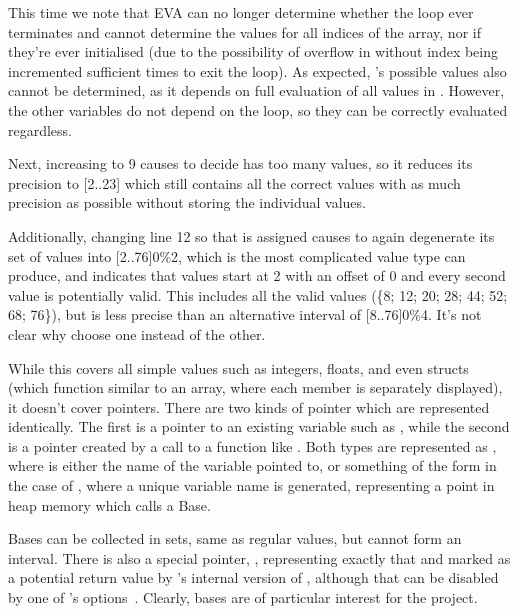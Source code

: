 This time we note that EVA can no longer determine whether the loop ever terminates and cannot determine the values for all indices of the  array, nor if they're ever initialised (due to the possibility of overflow in  without index being incremented sufficient times to exit the loop). As expected, 's possible values also cannot be determined, as it depends on full evaluation of all values in . However, the other variables do not depend on the loop, so they can be correctly evaluated regardless.

Next, increasing  to 9 causes  to decide  has too many values, so it reduces its precision to [2..23] which still contains all the correct values with as much precision as possible without storing the individual values.

Additionally, changing line 12 so that  is assigned  causes  to again degenerate its set of values into [2..76]0\%2, which is the most complicated value type  can produce, and indicates that values start at 2 with an offset of 0 and every second value is potentially valid. This includes all the valid values (\{8; 12; 20; 28; 44; 52; 68; 76\}), but is less precise than an alternative interval of [8..76]0\%4. It's not clear why  choose one instead of the other.

While this covers all simple values such as integers, floats, and even structs (which function similar to an array, where each member is separately displayed), it doesn't cover pointers. There are two kinds of pointer which are represented identically. The first is a pointer to an existing variable such as , while the second is a pointer created by a call to a function like \malloc{}. Both types are represented as , where  is either the name of the variable pointed to, or something of the form  in the case of \malloc{}, where a unique variable name is generated, representing a point in heap memory which  calls a Base.

Bases can be collected in sets, same as regular values, but cannot form an interval. There is also a special pointer, , representing exactly that and marked as a potential return value by 's internal version of \malloc{}, although that can be disabled by one of 's options~\cite{framamalloc}. Clearly, bases are of particular interest for the project.

